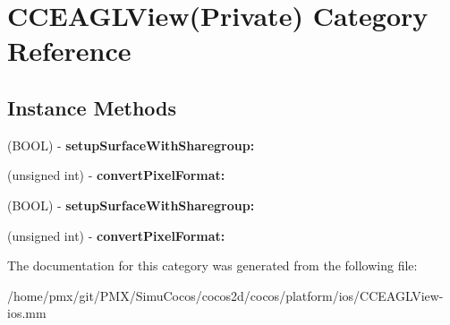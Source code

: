 \hypertarget{categoryCCEAGLView_07Private_08}{}\section{C\+C\+E\+A\+G\+L\+View(Private) Category Reference}
\label{categoryCCEAGLView_07Private_08}
\subsection*{Instance Methods}
\begin{DoxyCompactItemize}
\item 
\mbox{\label{categoryCCEAGLView_07Private_08_ae435666d8d07b57357fd921ea5da30b1}} 
(B\+O\+OL) -\/ {\bfseries setup\+Surface\+With\+Sharegroup\+:}
\item 
\mbox{\label{categoryCCEAGLView_07Private_08_a9361cf81ab9fbc6cb083153ca93233bf}} 
(unsigned int) -\/ {\bfseries convert\+Pixel\+Format\+:}
\item 
\mbox{\label{categoryCCEAGLView_07Private_08_ae435666d8d07b57357fd921ea5da30b1}} 
(B\+O\+OL) -\/ {\bfseries setup\+Surface\+With\+Sharegroup\+:}
\item 
\mbox{\label{categoryCCEAGLView_07Private_08_a9361cf81ab9fbc6cb083153ca93233bf}} 
(unsigned int) -\/ {\bfseries convert\+Pixel\+Format\+:}
\end{DoxyCompactItemize}


The documentation for this category was generated from the following file\+:\begin{DoxyCompactItemize}
\item 
/home/pmx/git/\+P\+M\+X/\+Simu\+Cocos/cocos2d/cocos/platform/ios/C\+C\+E\+A\+G\+L\+View-\/ios.\+mm\end{DoxyCompactItemize}
